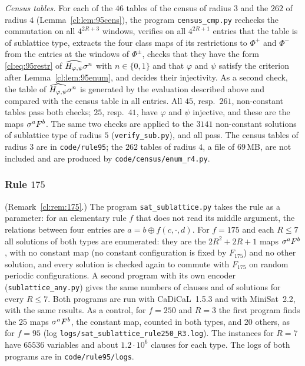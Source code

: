 \emph{Census tables.} For each of the $46$ tables of the census of radius $3$ and the $262$ of radius $4$ (Lemma~\ref{cl:lem:95cens}), the program \texttt{census\_cmp.py} rechecks the commutation on all $4^{2R+3}$ windows, verifies on all $4^{2R+1}$ entries that the table is of sublattice type, extracts the four class maps of its restrictions to $\Phi^+$ and $\Phi^-$ from the entries at the windows of $\Phi^\pm$, checks that they have the form \eqref{cl:eq:95restr} of $\widehat{H_{\varphi,\psi}}\sigma^n$ with $n\in\{0,1\}$ and that $\varphi$ and $\psi$ satisfy the criterion after Lemma~\ref{cl:lem:95enum}, and decides their injectivity. As a second check, the table of $\widehat{H_{\varphi,\psi}}\sigma^n$ is generated by the evaluation described above and compared with the census table in all entries. All $45$, resp.\ $261$, non-constant tables pass both checks; $25$, resp.\ $41$, have $\varphi$ and $\psi$ injective, and these are the maps $\sigma^aF^b$. The same two checks are applied to the $3141$ non-constant solutions of sublattice type of radius $5$ (\texttt{verify\_sub.py}), and all pass. The census tables of radius $3$ are in \texttt{code/rule95}; the $262$ tables of radius $4$, a file of $69$\,MB, are not included and are produced by \texttt{code/census/enum\_r4.py}.

\subsubsection{Rule $175$}\label{app:175} (Remark~\ref{cl:rem:175}.) The program \texttt{sat\_sublattice.py} takes the rule as a parameter: for an elementary rule $f$ that does not read its middle argument, the relations between four entries are $a=b\oplus f(c,\cdot,d)$. For $f=175$ and each $R\le7$ all solutions of both types are enumerated: they are the $2R^2+2R+1$ maps $\sigma^aF^b$, with no constant map (no constant configuration is fixed by $F_{175}$) and no other solution, and every solution is checked again to commute with $F_{175}$ on random periodic configurations. A second program with its own encoder (\texttt{sublattice\_any.py}) gives the same numbers of clauses and of solutions for every $R\le7$. Both programs are run with CaDiCaL~1.5.3 and with MiniSat~2.2, with the same results. As a control, for $f=250$ and $R=3$ the first program finds the $25$ maps $\sigma^aF^b$, the constant map, counted in both types, and $20$ others, as for $f=95$ (log \texttt{logs/sat\_sublattice\_rule250\_R3.log}). The instances for $R=7$ have $65536$ variables and about $1.2\cdot10^6$ clauses for each type. The logs of both programs are in \texttt{code/rule95/logs}.

